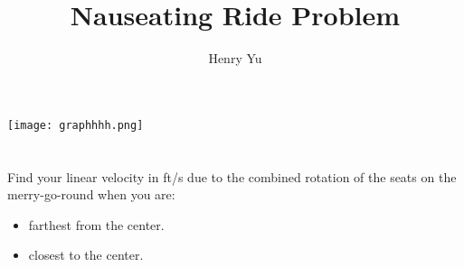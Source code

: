 \documentclass[a4paper]{article}
\author{Henry Yu}
\title{Nauseating Ride Problem}
\date{}
\begin{document}
\maketitle

\hspace{3.8cm}
\texttt{[image: graphhhh.png]}

\section{}
Find your linear velocity in ft/s due to the combined rotation of the seats on the merry-go-round when you are:
\begin{itemize}
 \item farthest from the center.
 \item closest to the center. \vspace{6mm}


\end{itemize}
\end{document}
